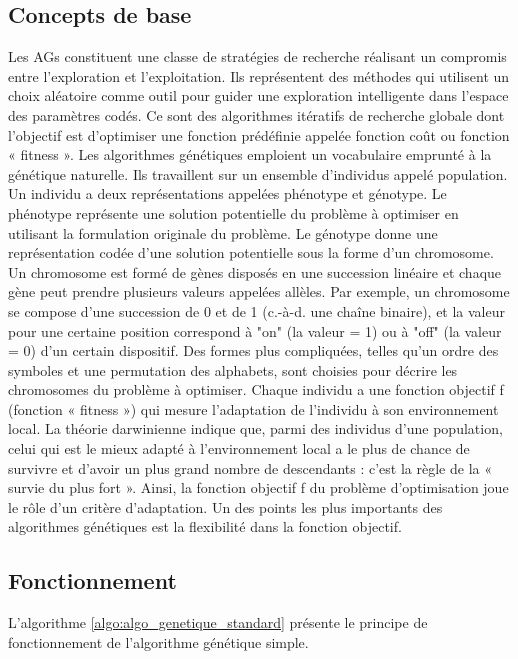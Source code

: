 	\subsection{Concepts de base}
	Les AGs constituent une classe de stratégies de recherche réalisant un compromis entre l’exploration et l’exploitation. Ils représentent des méthodes qui utilisent
un choix aléatoire comme outil pour guider une exploration intelligente dans l’espace des paramètres codés. Ce sont des algorithmes itératifs de recherche globale dont l’objectif est d’optimiser une fonction prédéfinie appelée fonction coût ou fonction « fitness ».
	Les algorithmes génétiques emploient un vocabulaire emprunté à la génétique naturelle. Ils travaillent sur un ensemble d’individus appelé population. Un individu a deux représentations appelées phénotype et génotype. Le phénotype représente une solution potentielle du problème à optimiser en utilisant la formulation originale du problème. Le génotype donne une représentation codée
d’une solution potentielle sous la forme d’un chromosome. Un chromosome est formé de gènes disposés en une succession linéaire et chaque gène peut prendre plusieurs
valeurs appelées allèles. Par exemple, un chromosome se compose d’une succession de 0 et de 1 (c.-à-d. une chaîne binaire), et la valeur pour une certaine position correspond à "on" (la valeur = 1) ou à "off" (la valeur = 0) d’un certain dispositif. Des formes plus compliquées, telles qu’un ordre des symboles et une permutation des alphabets, sont choisies pour décrire les chromosomes du problème à optimiser. Chaque individu a une fonction objectif f (fonction « fitness ») qui mesure l’adaptation de l’individu à son environnement local. La théorie darwinienne indique que, parmi des individus d’une population, celui qui est le mieux adapté à l’environnement local a le plus de chance de survivre et d’avoir un plus grand nombre de descendants : c’est la règle de la « survie du plus fort ». Ainsi, la
fonction objectif f du problème d’optimisation joue le rôle d’un critère d’adaptation. Un des points les plus importants des algorithmes génétiques est la flexibilité dans la fonction objectif.

	\subsection{Fonctionnement}
	
	L'algorithme \ref{algo:algo_genetique_standard} présente le principe de fonctionnement de l'algorithme génétique simple.\\
	 
